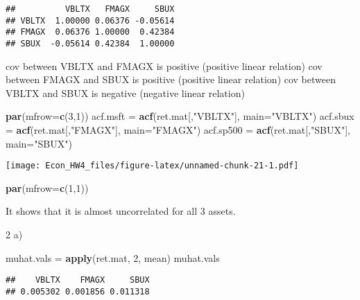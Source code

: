 \documentclass[]{article}
\newenvironment{Shaded}{\begin{snugshade}}{\end{snugshade}}
\newcommand{\KeywordTok}[1]{\textcolor[rgb]{0.13,0.29,0.53}{\textbf{#1}}}
\newcommand{\DataTypeTok}[1]{\textcolor[rgb]{0.13,0.29,0.53}{#1}}
\newcommand{\DecValTok}[1]{\textcolor[rgb]{0.00,0.00,0.81}{#1}}
\newcommand{\StringTok}[1]{\textcolor[rgb]{0.31,0.60,0.02}{#1}}
\newcommand{\NormalTok}[1]{#1}
\begin{document}
\begin{verbatim}
##          VBLTX   FMAGX     SBUX
## VBLTX  1.00000 0.06376 -0.05614
## FMAGX  0.06376 1.00000  0.42384
## SBUX  -0.05614 0.42384  1.00000
\end{verbatim}

cov between VBLTX and FMAGX is positive (positive linear relation) cov
between FMAGX and SBUX is positive (positive linear relation) cov
between VBLTX and SBUX is negative (negative linear relation)

\begin{Shaded}
\begin{Highlighting}[]
\KeywordTok{par}\NormalTok{(}\DataTypeTok{mfrow=}\KeywordTok{c}\NormalTok{(}\DecValTok{3}\NormalTok{,}\DecValTok{1}\NormalTok{))}
\NormalTok{    acf.msft =}\StringTok{ }\KeywordTok{acf}\NormalTok{(ret.mat[,}\StringTok{"VBLTX"}\NormalTok{], }\DataTypeTok{main=}\StringTok{"VBLTX"}\NormalTok{)}
\NormalTok{    acf.sbux =}\StringTok{ }\KeywordTok{acf}\NormalTok{(ret.mat[,}\StringTok{"FMAGX"}\NormalTok{], }\DataTypeTok{main=}\StringTok{"FMAGX"}\NormalTok{)}
\NormalTok{    acf.sp500 =}\StringTok{ }\KeywordTok{acf}\NormalTok{(ret.mat[,}\StringTok{"SBUX"}\NormalTok{], }\DataTypeTok{main=}\StringTok{"SBUX"}\NormalTok{)}
\end{Highlighting}
\end{Shaded}

\texttt{[image: Econ\_HW4\_files/figure-latex/unnamed-chunk-21-1.pdf]}

\begin{Shaded}
\begin{Highlighting}[]
\KeywordTok{par}\NormalTok{(}\DataTypeTok{mfrow=}\KeywordTok{c}\NormalTok{(}\DecValTok{1}\NormalTok{,}\DecValTok{1}\NormalTok{))}
\end{Highlighting}
\end{Shaded}

It shows that it is almost uncorrelated for all 3 assets.

2 a)

\begin{Shaded}
\begin{Highlighting}[]
\NormalTok{muhat.vals =}\StringTok{ }\KeywordTok{apply}\NormalTok{(ret.mat, }\DecValTok{2}\NormalTok{, mean)}
\NormalTok{muhat.vals}
\end{Highlighting}
\end{Shaded}

\begin{verbatim}
##    VBLTX    FMAGX     SBUX 
## 0.005302 0.001856 0.011318
\end{verbatim}
\end{document}
